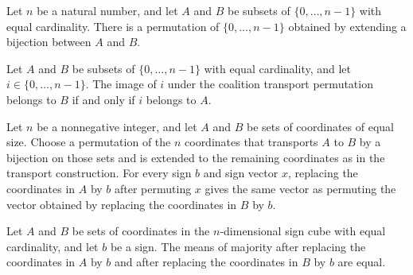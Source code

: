 \begin{definition}
\label{FABL.coalitionTransportPerm}
\leanok
Let $n$ be a natural number, and let $A$ and $B$ be subsets of $\{0,\ldots,n-1\}$ with
equal cardinality. There is a permutation of $\{0,\ldots,n-1\}$ obtained by extending a
bijection between $A$ and $B$.
\end{definition}

\begin{theorem}
\label{FABL.mem_coalitionTransportPerm_iff}
\leanok
{}
Let $A$ and $B$ be subsets of $\{0,\ldots,n-1\}$ with equal cardinality, and let
$i\in\{0,\ldots,n-1\}$. The image of $i$ under the coalition transport permutation
belongs to $B$ if and only if $i$ belongs to $A$.
\end{theorem}

\begin{theorem}
\label{FABL.bribeInput_permuteInput_coalitionTransport}
\leanok
{}
Let $n$ be a nonnegative integer, and let $A$ and $B$ be sets of coordinates of equal
size. Choose a permutation of the $n$ coordinates that transports $A$ to $B$ by a
bijection on those sets and is extended to the remaining coordinates as in the transport
construction. For every sign $b$ and sign vector $x$, replacing the coordinates in $A$
by $b$ after permuting $x$ gives the same vector as permuting the vector obtained by
replacing the coordinates in $B$ by $b$.
\end{theorem}

\begin{theorem}
\label{FABL.mean_bribeFunction_majority_eq_of_card}
\leanok
{}
Let $A$ and $B$ be sets of coordinates in the $n$-dimensional sign cube with equal
cardinality, and let $b$ be a sign. The means of majority after replacing the
coordinates in $A$ by $b$ and after replacing the coordinates in $B$ by $b$ are equal.
\end{theorem}


